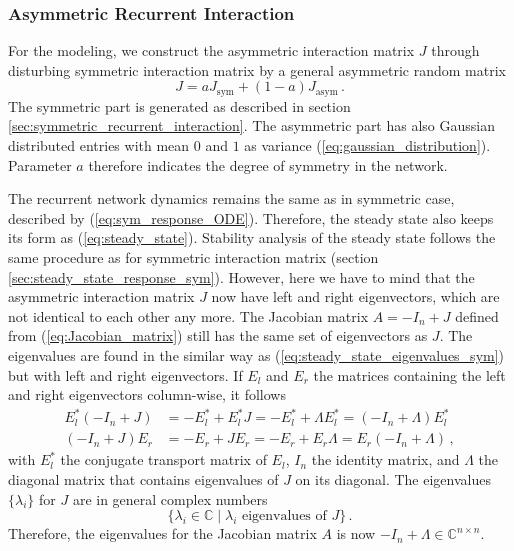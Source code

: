 \documentclass[11pt]{article}
\begin{document}
	
	\subsubsection{Asymmetric Recurrent Interaction}
	For the modeling, we construct the asymmetric interaction matrix $J$ through disturbing symmetric interaction matrix by a general asymmetric random matrix
		\begin{equation} \label{eq:asym_interaction_matrix}
			J = a J_{\text{sym}} + (1-a) J_{\text{asym}} \, .
		\end{equation}
	The symmetric part is generated as described in section \ref{sec:symmetric_recurrent_interaction}. The asymmetric part has also Gaussian distributed entries with mean $0$ and $1$ as variance (\ref{eq:gaussian_distribution}). Parameter $a$ therefore indicates the degree of symmetry in the network. 
	
	The recurrent network dynamics remains the same as in symmetric case, described by (\ref{eq:sym_response_ODE}). Therefore, the steady state also keeps its form as (\ref{eq:steady_state}). Stability analysis of the steady state follows the same procedure as for symmetric interaction matrix (section \ref{sec:steady_state_response_sym}). However, here we have to mind that the asymmetric interaction matrix $J$ now have left and right eigenvectors, which are not identical to each other any more. The Jacobian matrix $A = -I_n + J$ defined from (\ref{eq:Jacobian_matrix}) still has the same set of eigenvectors as $J$. The eigenvalues are found in the similar way as (\ref{eq:steady_state_eigenvalues_sym}) but with left and right eigenvectors. If $E_l$ and $E_r$ the matrices containing the left and right eigenvectors column-wise, it follows
		\begin{equation}
			\begin{split}
				E_l^*(-I_n + J) &= - E_l^* + E_l^* J =  - E_l^* + \Lambda E_l^* = (-I_n + \Lambda) E_l^* \\
				(-I_n + J) E_r &= - E_r + J E_r = -E_r + E_r \Lambda = E_r (-I_n + \Lambda) \, , 
			\end{split}
		\end{equation}	
	with $E_l^*$ the conjugate transport matrix of $E_l$, $I_n$ the identity matrix, and $\Lambda$ the diagonal matrix that contains eigenvalues of $J$ on its diagonal. The eigenvalues $\{\lambda_i\}$ for $J$ are in general complex numbers
	\begin{equation}
		\{\lambda_i \in \mathbb{C} \mid \lambda_i \text{ eigenvalues of $J$}\} \, .
	\end{equation}
	Therefore, the eigenvalues for the Jacobian matrix $A$ is now $-I_n + \Lambda \in \mathbb{C}^{n \times n}$. 
	
\end{document}
